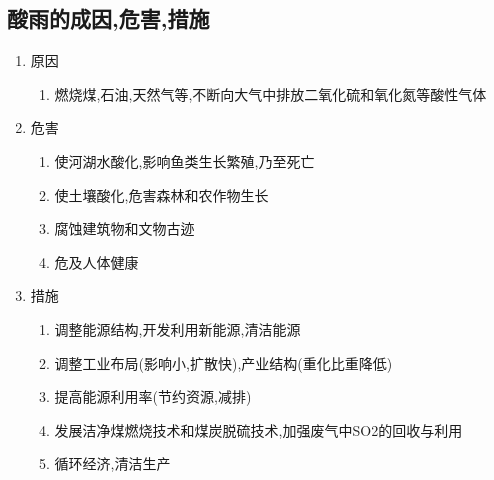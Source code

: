 \documentclass[a4paper]{article}
\begin{document}
    \subsection{酸雨的成因,危害,措施}
    \begin{enumerate}
        \item 原因
        \begin{enumerate}
            \item 燃烧煤,石油,天然气等,不断向大气中排放二氧化硫和氧化氮等酸性气体
        \end{enumerate}
        \item 危害
        \begin{enumerate}
            \item 使河湖水酸化,影响鱼类生长繁殖,乃至死亡
            \item 使土壤酸化,危害森林和农作物生长
            \item 腐蚀建筑物和文物古迹
            \item 危及人体健康
        \end{enumerate}
        \item 措施
        \begin{enumerate}
            \item 调整能源结构,开发利用新能源,清洁能源
            \item 调整工业布局(影响小,扩散快),产业结构(重化比重降低)
            \item 提高能源利用率(节约资源,减排)
            \item 发展洁净煤燃烧技术和煤炭脱硫技术,加强废气中SO2的回收与利用
            \item 循环经济,清洁生产
        \end{enumerate}
    \end{enumerate}
\end{document}
